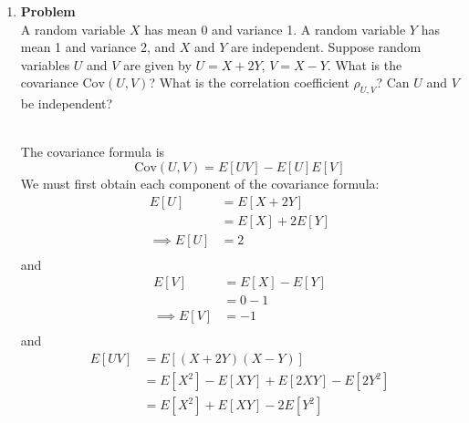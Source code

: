 \documentclass[12pt]{article}
\newenvironment{Ex}{\textbf{Problem}\vspace{.75em}\\}{}
\begin{document}
\begin{enumerate}
\begin{Ex}
\begin{solution}
\begin{equation}
\begin{aligned}
          \implies f_Z(z) &= \sum_{x}f_Y(z-x)p_X(x) \\
        \end{aligned}
      \end{equation}
    \end{solution}
  \end{Ex}
\item
  \begin{Ex}
    A random variable $X$ has mean 0 and variance 1. A random variable
    $Y$ has mean 1 and variance 2, and $X$ and $Y$ are
    independent. Suppose random variables $U$ and $V$ are given by
    $U=X+2Y$, $V = X-Y$. What is the covariance $\text{Cov}(U,V)$?
    What is the correlation coefficient $\rho_{U,V}$? Can $U$ and $V$
    be independent?
    \begin{solution} \hfill \vspace{.75em} \\
      The covariance formula is
      \begin{equation}
        \label{eq:4-cov}
        \text{Cov}(U,V) = E[UV] - E[U]E[V]
      \end{equation}
      We must first obtain each component of the covariance formula:
      \begin{equation}
        \label{eq:4-e-u}
        \begin{aligned}
          E[U] &= E[X+2Y] \\
          &= E[X] + 2E[Y] \\
          \implies E[U] &= 2 \\
        \end{aligned}
      \end{equation}
      and
      \begin{equation}
        \label{eq:4-e-v}
        \begin{aligned}
          E[V] &= E[X]-E[Y] \\
          &= 0-1 \\
          \implies E[V] &= -1 \\
        \end{aligned}
      \end{equation}
      and
      \begin{equation}
        \label{eq:4-e-uv}
        \begin{aligned}
          E[UV] &= E[(X+2Y)(X-Y)] \\
          &= E[X^2] - E[XY] + E[2XY] - E[2Y^2] \\
          &= E[X^2] + E[XY] - 2E[Y^2] \\

\end{aligned}
\end{equation}
\end{solution}
\end{Ex}
\end{enumerate}
\end{document}
